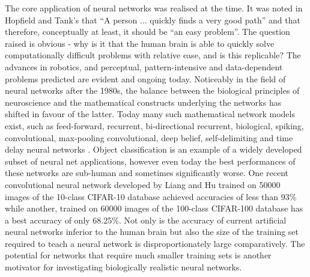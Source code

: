 \documentclass[11pt, twocolumn]{article}
\begin{document}
The core application of neural networks was realised at the time. It was noted in Hopfield and Tank's that ``A person ... quickly finds a very good path'' and that therefore, conceptually at least, it should be ``an easy problem''. The question raised is obvious - why is it that the human brain is able to quickly solve computationally difficult problems with relative ease, and is this replicable? The advances in robotics, and perceptual, pattern-intensive and data-dependent problems predicted \cite{hopfield1985neural} are evident and ongoing today. Noticeably in the field of neural networks after the 1980s, the balance between the biological principles of neuroscience and the mathematical constructs underlying the networks has shifted in favour of the latter. Today many such mathematical network models exist, such as feed-forward, recurrent, bi-directional recurrent, biological, spiking, convolutional, max-pooling convolutional, deep belief, self-delimiting and time delay neural networks \cite{schmidhuber2015deep}. Object classification is an example of a widely developed subset of neural net applications, however even today the best performances of these networks are sub-human and sometimes significantly worse. One recent convolutional neural network developed by Liang and Hu \cite{liang2015recurrent} trained on 50000 images of the 10-class CIFAR-10 database achieved accuracies of less than 93\% while another, trained on 60000 images of the 100-class CIFAR-100 database has a best accuracy of only 68.25\%. Not only is the accuracy of current artificial neural networks inferior to the human brain but also the size of the training set required to teach a neural network is disproportionately large comparatively. The potential for networks that require much smaller training sets is another motivator for investigating biologically realistic neural networks.
\end{document}
